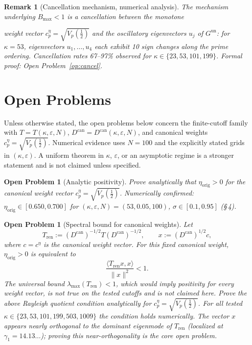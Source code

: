 \documentclass[11pt]{article}
\newtheorem*{remark}{Remark}
\newtheorem{openproblem}[theorem]{Open Problem}
\newcommand{\etaorig}{\eta_{\mathrm{orig}}}
\newcommand{\Tren}{T_{\mathrm{ren}}}
\newcommand{\Gun}{G^{\mathrm{un}}}
\newcommand{\Dcan}{D^{\mathrm{can}}}
\newcommand{\ceta}{c_p^{\eta}}
\begin{document}
\begin{remark}[Cancellation mechanism, numerical analysis]
The mechanism underlying $B_{\max}<1$ is a cancellation between the monotone

weight vector $\ceta=\sqrt{V_p(\tfrac12)}$ and the oscillatory eigenvectors $u_j$
of $\Gun$: for $\kappa=53$, eigenvectors $u_1,\ldots,u_4$ each exhibit 10
sign changes along the prime ordering. Cancellation rates 67--97\% observed
for $\kappa\in\{23,53,101,199\}$. Formal proof: Open Problem~\ref{op:cancel}.
\end{remark}

\section{Open Problems}

Unless otherwise stated, the open problems below concern the finite-cutoff
family with $T=T(\kappa,\varepsilon,N)$,
$D^{\mathrm{can}}=D^{\mathrm{can}}(\kappa,\varepsilon,N)$, and canonical
weights $c_p^\eta=\sqrt{V_p(\tfrac12)}$.
Numerical evidence uses $N=100$ and the explicitly stated grids in
$(\kappa,\varepsilon)$.
A uniform theorem in $\kappa$, $\varepsilon$, or an asymptotic regime is a
stronger statement and is not claimed unless specified.


\begin{openproblem}[Analytic positivity]\label{op:pos}
Prove analytically that $\etaorig>0$ for the canonical weight vector
$\ceta=\sqrt{V_p(\tfrac12)}$.
Numerically confirmed: $\etaorig\in[0.650,0.700]$ for $(\kappa,\varepsilon,N)=(53,0.05,100)$,
$\sigma\in[0.1,0.95]$ (\S\,4).
\end{openproblem}

\begin{openproblem}[Spectral bound for canonical weights]\label{op:spectral}
Let
\[
\Tren:=(\Dcan)^{-1/2}T(\Dcan)^{-1/2},\qquad x:=(\Dcan)^{1/2}c,
\]
where $c=c^\eta$ is the canonical weight vector. For this fixed canonical
weight, $\etaorig>0$ is equivalent to
\[
\frac{\langle\Tren x,x\rangle}{\|x\|^2}<1.
\]
The universal bound $\lambda_{\max}(\Tren)<1$, which would imply positivity
for every weight vector, is not true on the tested cutoffs and is not
claimed here.
Prove the above Rayleigh quotient condition analytically for
$c_p^\eta=\sqrt{V_p(\tfrac12)}$.
For all tested $\kappa\in\{23,53,101,199,503,1009\}$ the condition holds
numerically. The vector $x$ appears nearly orthogonal to the dominant
eigenmode of $\Tren$ (localized at $\gamma_1=14.13\ldots$); proving this
near-orthogonality is the core open problem.
\end{openproblem}
\end{document}
